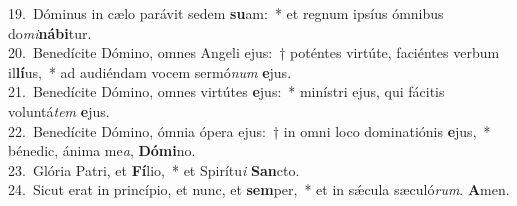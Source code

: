 {19.~}Dóminus in cælo parávit sedem \textbf{su}am:~* et regnum ipsíus ómnibus do\textit{mi}\textbf{ná}\textbf{bi}tur.\\
{20.~}Benedícite Dómino, omnes Angeli ejus:~† poténtes virtúte, faciéntes verbum il\textbf{lí}us,~* ad audiéndam vocem sermó\textit{num} \textbf{e}jus.\\
{21.~}Benedícite Dómino, omnes virtútes \textbf{e}jus:~* minístri ejus, qui fácitis voluntá\textit{tem} \textbf{e}jus.\\
{22.~}Benedícite Dómino, ómnia ópera ejus:~† in omni loco dominatiónis \textbf{e}jus,~* bénedic, ánima me\textit{a}, \textbf{Dó}\textbf{mi}no.\\
{23.~}Glória Patri, et \textbf{Fí}lio,~* et Spirítu\textit{i} \textbf{San}cto.\\
{24.~}Sicut erat in princípio, et nunc, et \textbf{sem}per,~* et in sǽcula sæculó\textit{rum}. \textbf{A}men.\\
